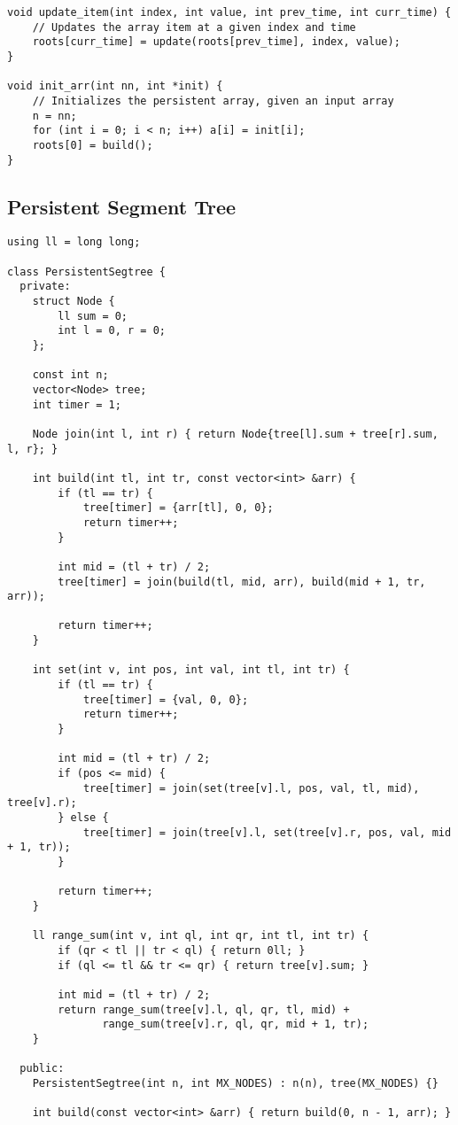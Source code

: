 \documentclass[10pt]{article}
\begin{document}
\begin{multicols*}{2}
\begin{lstlisting}[style=compactcpp]
void update_item(int index, int value, int prev_time, int curr_time) {
	// Updates the array item at a given index and time
	roots[curr_time] = update(roots[prev_time], index, value);
}

void init_arr(int nn, int *init) {
	// Initializes the persistent array, given an input array
	n = nn;
	for (int i = 0; i < n; i++) a[i] = init[i];
	roots[0] = build();
}
\end{lstlisting}

\subsection{Persistent Segment Tree}

\begin{lstlisting}[style=compactcpp]
using ll = long long;

class PersistentSegtree {
  private:
	struct Node {
		ll sum = 0;
		int l = 0, r = 0;
	};

	const int n;
	vector<Node> tree;
	int timer = 1;

	Node join(int l, int r) { return Node{tree[l].sum + tree[r].sum, l, r}; }

	int build(int tl, int tr, const vector<int> &arr) {
		if (tl == tr) {
			tree[timer] = {arr[tl], 0, 0};
			return timer++;
		}

		int mid = (tl + tr) / 2;
		tree[timer] = join(build(tl, mid, arr), build(mid + 1, tr, arr));

		return timer++;
	}

	int set(int v, int pos, int val, int tl, int tr) {
		if (tl == tr) {
			tree[timer] = {val, 0, 0};
			return timer++;
		}

		int mid = (tl + tr) / 2;
		if (pos <= mid) {
			tree[timer] = join(set(tree[v].l, pos, val, tl, mid), tree[v].r);
		} else {
			tree[timer] = join(tree[v].l, set(tree[v].r, pos, val, mid + 1, tr));
		}

		return timer++;
	}

	ll range_sum(int v, int ql, int qr, int tl, int tr) {
		if (qr < tl || tr < ql) { return 0ll; }
		if (ql <= tl && tr <= qr) { return tree[v].sum; }

		int mid = (tl + tr) / 2;
		return range_sum(tree[v].l, ql, qr, tl, mid) +
		       range_sum(tree[v].r, ql, qr, mid + 1, tr);
	}

  public:
	PersistentSegtree(int n, int MX_NODES) : n(n), tree(MX_NODES) {}

	int build(const vector<int> &arr) { return build(0, n - 1, arr); }


\end{lstlisting}
\end{multicols*}
\end{document}
